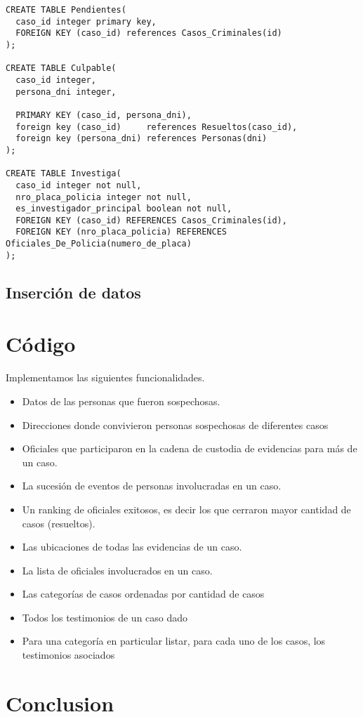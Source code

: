 \documentclass[10pt,a4paper]{article}
\begin{document}
\begin{verbatim}
CREATE TABLE Pendientes(
  caso_id integer primary key,
  FOREIGN KEY (caso_id) references Casos_Criminales(id)
);

CREATE TABLE Culpable(
  caso_id integer,
  persona_dni integer,

  PRIMARY KEY (caso_id, persona_dni),
  foreign key (caso_id)     references Resueltos(caso_id),
  foreign key (persona_dni) references Personas(dni)
);

CREATE TABLE Investiga(
  caso_id integer not null,
  nro_placa_policia integer not null,
  es_investigador_principal boolean not null,
  FOREIGN KEY (caso_id) REFERENCES Casos_Criminales(id),
  FOREIGN KEY (nro_placa_policia) REFERENCES Oficiales_De_Policia(numero_de_placa)
);

\end{verbatim}
\subsection{Inserción de datos}

\section{Código}
Implementamos las siguientes funcionalidades.

\begin{itemize}
\item Datos de las personas que fueron sospechosas.
\item Direcciones donde convivieron personas sospechosas de diferentes casos
\item Oficiales que participaron en la cadena de custodia de evidencias para más de un
caso.
\item La sucesión de eventos de personas involucradas en un caso.
\item Un ranking de oficiales exitosos, es decir los que cerraron mayor cantidad de casos
(resueltos).
\item Las ubicaciones de todas las evidencias de un caso.
\item La lista de oficiales involucrados en un caso.
\item Las categorías de casos ordenadas por cantidad de casos
\item Todos los testimonios de un caso dado
\item Para una categoría en particular listar, para cada uno de los casos, los testimonios
asociados
\end{itemize}
\section{Conclusion}
\end{document}
